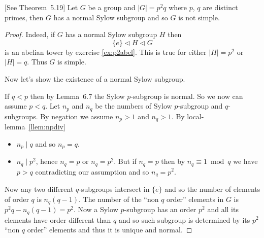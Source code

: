 \documentclass[12pt]{book}
\newcommand{\eG}{\ensuremath{\{e\}}}
\def\subnormal{\vartriangleleft}
\begin{document}
\begin{llem} \label{rose94:p2q}
\textnormal{\small [See \cite{Rose94} Theorem~5.19]}
Let $G$ be a group and \(|G|=p^2q\) where $p$, $q$ are distinct primes,
then $G$ has a normal  Sylow subgroup and so $G$ is not simple.
\end{llem}
\begin{proof}
Indeed, if $G$ has a normal Sylow subgroup $H$ then
\[\eG\subnormal H \subnormal G\]
is an abelian tower by exercise \ref{ex:p2abel}.
This is true for either \(|H|=p^2\) or \(|H|=q\).
Thus $G$ is simple.

Now let's show the existence of a normal Sylow subgroup.

If \(q<p\) then by Lemma~6.7 the Sylow $p$-subgroup is normal.
So we now can assume \(p<q\).
Let \(n_p\) and \(n_q\) be the numbers of
Sylow $p$-subgroup and $q$-subgroups. By negation we assume
\(n_p > 1\) and \(n_q > 1\).
By local-lemma~\ref{llem:npdiv}
\begin{itemize}
 \item
   \(n_p\mid q\) and so \(n_p=q\).
 \item
   \(n_q\mid p^2\), hence \(n_q=p\) or \(n_q=p^2\).
   But  if \(n_q=p\) then by \(n_q\equiv 1 \bmod q\) we have \(p>q\)
   contradicting our assumption and so \(n_q=p^2\).
\end{itemize}
Now any two different $q$-subgroups intersect in \eG
and so the number of elements of order $q$ is \(n_q(q-1)\).
The number of the ``non $q$ order'' elements in $G$ is \(p^2q - n_q(q-1)=p^2\).
Now a Sylow $p$-subgroup has an order \(p^2\) and all its elements
have order different than $q$ and so such subgroup is determined
by its \(p^2\) ``non $q$ order'' elements
and thus it is unique and normal.
\end{proof}
\end{document}

